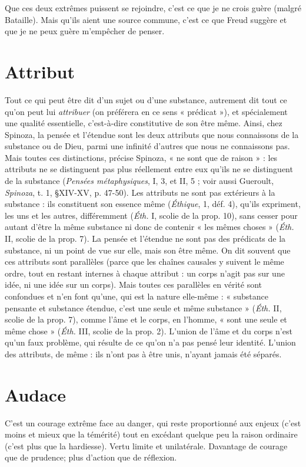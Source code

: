 Que ces deux extrêmes puissent se rejoindre, c’est ce que je ne crois guère
(malgré Bataille). Mais qu’ils aient une source commune, c’est ce que Freud
suggère et que je ne peux guère m'empêcher de penser.

\section{Attribut}
Tout ce qui peut être dit d’un sujet ou d’une substance, autrement
dit tout ce qu’on peut lui {\it attribuer} (on préférera en ce
sens « prédicat »), et spécialement une qualité essentielle, c’est-à-dire constitutive
de son être même. Ainsi, chez Spinoza, la pensée et l’étendue sont les deux
attributs que nous connaissons de la substance ou de Dieu, parmi une infinité
d’autres que nous ne connaissons pas. Mais toutes ces distinctions, précise Spinoza,
« ne sont que de raison » : les attributs ne se distinguent pas plus réellement
entre eux qu'ils ne se distinguent de la substance ({\it Pensées métaphysiques},
I, 3, et II, 5 ; voir aussi Gueroult, {\it Spinoza}, t. 1, \S XIV-XV, p. 47-50). Les attributs
ne sont pas extérieurs à la substance : ils constituent son essence même
({\it Éthique}, 1, déf. 4), qu’ils expriment, les uns et les autres, différemment ({\it Éth.} I,
scolie de la prop. 10), sans cesser pour autant d’être la même substance ni donc
de contenir « les mêmes choses » ({\it Éth.} II, scolie de la prop. 7). La pensée et
l'étendue ne sont pas des prédicats de la substance, ni un point de vue sur elle,
mais son être même. On dit souvent que ces attributs sont parallèles (parce que
les chaînes causales y suivent le même ordre, tout en restant internes à chaque
attribut : un corps n’agit pas sur une idée, ni une idée sur un corps). Mais
toutes ces parallèles en vérité sont confondues et n’en font qu’une, qui est la
nature elle-même : « substance pensante et substance étendue, c’est une seule et
même substance » ({\it Éth.} II, scolie de la prop. 7), comme l’âme et le corps, en
l’homme, « sont une seule et même chose » ({\it Éth.} III, scolie de la prop. 2).
L'union de l’âme et du corps n’est qu’un faux problème, qui résulte de ce qu'on
n’a pas pensé leur identité. L'union des attributs, de même : ils n’ont pas à être
unis, n’ayant jamais été séparés.

\section{Audace}
C'est un courage extrême face au danger, qui reste proportionné
aux enjeux (c’est moins et mieux que la témérité) tout en excédant
quelque peu la raison ordinaire (c’est plus que la hardiesse). Vertu limite et unilatérale.
Davantage de courage que de prudence; plus d’action que de
réflexion.

